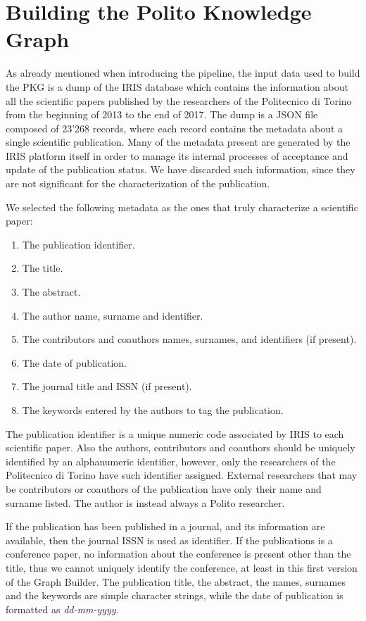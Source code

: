 \documentclass[%
    corpo=13.5pt,
    twoside,
    oldstyle,
    tipotesi=magistrale,
    greek,
    evenboxes
]{toptesi}
\begin{document}
\section{Building the Polito Knowledge Graph}
\label{sec:buildingpkg}

As already mentioned when introducing the pipeline, the input data used to
build the PKG is a dump of the IRIS database which contains the information about
all the scientific papers published by the researchers of the Politecnico di
Torino from the beginning of 2013 to the end of 2017.
The dump is a JSON file composed of 23'268 records, where each record contains
the metadata about a single scientific publication.
Many of the metadata present are generated by the IRIS platform itself in
order to manage its internal processes of acceptance and update of the
publication status. We have discarded such information, since they are not
significant for the characterization of the publication.

We selected the following metadata as the ones that truly characterize a
scientific paper:

\begin{enumerate}
    \item The publication identifier.
    \item The title.
    \item The abstract.
    \item The author name, surname and identifier.
    \item The contributors and coauthors names, surnames, and identifiers
        (if present).
    \item The date of publication.
    \item The journal title and ISSN (if present).
    \item The keywords entered by the authors to tag the publication.
\end{enumerate}

The publication identifier is a unique numeric code associated by IRIS to each
scientific paper. Also the authors, contributors and coauthors should be
uniquely identified by an alphanumeric identifier, however, only the researchers
of the Politecnico di Torino have such identifier assigned. External
researchers that may be contributors or coauthors of the publication have only
their name and surname listed. The author is instead always a Polito researcher.

If the publication has been published in a journal, and its information are
available, then the journal ISSN is used as identifier.
If the publications is a conference paper, no information about the conference
is present other than the title, thus we cannot uniquely identify the
conference, at least in this first version of the Graph Builder.
The publication title, the abstract, the names, surnames and the keywords are
simple character strings, while the date of publication is formatted as
\emph{dd-mm-yyyy}.
\end{document}
